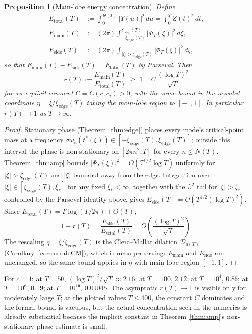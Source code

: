 \documentclass[11pt,a4paper]{article}
\theoremstyle{plain}
\newtheorem{proposition}[theorem]{Proposition}
\theoremstyle{definition}
\begin{document}
\begin{proposition}[Main-lobe energy concentration]\label{prop:conc}
Define
\begin{align*}
E_{\mathrm{total}}(T) &:= \int_0^{\Theta(T)}|Y(u)|^2\,du = \int_0^T Z(t)^2\,dt,\\
E_{\mathrm{main}}(T) &:= (2\pi)\int_{-\xi_{\mathrm{edge}}(T)}^{\xi_{\mathrm{edge}}(T)}|\Phi_T(\xi)|^2\,d\xi,\\
E_{\mathrm{side}}(T) &:= (2\pi)\int_{|\xi|>\xi_{\mathrm{edge}}(T)}|\Phi_T(\xi)|^2\,d\xi,
\end{align*}
so that $E_{\mathrm{main}}(T)+E_{\mathrm{side}}(T)=E_{\mathrm{total}}(T)$ by Parseval. Then
\[
r(T):=\frac{E_{\mathrm{main}}(T)}{E_{\mathrm{total}}(T)}\;\ge\;1-C\,\frac{(\log T)^2}{\sqrt{T}}
\]
for an explicit constant $C=C(c,c_\star)>0$, with the same bound in the rescaled coordinate $\eta=\xi/\xi_{\mathrm{edge}}(T)$ taking the main-lobe region to $[-1,1]$. In particular $r(T)\to 1$ as $T\to\infty$.
\end{proposition}
\begin{proof}
Stationary phase (Theorem~\ref{thm:edge}) places every mode's critical-point mass at a frequency $\sigma\omega_n(t^*(\xi))\in[-\xi_{\mathrm{edge}}(T),\xi_{\mathrm{edge}}(T)]$; outside this interval the phase is non-stationary on $[2\pi n^2,T]$ for every $n\le N(T)$. Theorem~\ref{thm:amp} bounds $|\Phi_T(\xi)|^2=O(T^{1/2}\log T)$ uniformly for $|\xi|>\xi_{\mathrm{edge}}(T)$ and $|\xi|$ bounded away from the edge. Integration over $|\xi|\in[\xi_{\mathrm{edge}}(T),\xi_*]$ for any fixed $\xi_*<\infty$, together with the $L^2$ tail for $|\xi|>\xi_*$ controlled by the Parseval identity above, gives $E_{\mathrm{side}}(T)=O(T^{1/2}(\log T)^2)$. Since $E_{\mathrm{total}}(T)=T\log(T/2\pi)+O(T)$,
\[
1-r(T)=\frac{E_{\mathrm{side}}(T)}{E_{\mathrm{total}}(T)}=O\!\left(\frac{(\log T)^2}{\sqrt{T}}\right).
\]
The rescaling $\eta=\xi/\xi_{\mathrm{edge}}(T)$ is the Clerc--Mallat dilation $\mathcal{D}_{a(T)}$ (Corollary~\ref{cor:rescaleCM}), which is mass-preserving: $E_{\mathrm{main}}$ and $E_{\mathrm{side}}$ are unchanged, so the same bound applies in $\eta$ with main-lobe region $[-1,1]$.
\end{proof}

\begin{remark}
For $c=1$: at $T=50$, $(\log T)^2/\sqrt{T}\approx 2.16$; at $T=100$, $2.12$; at $T=10^4$, $0.85$; at $T=10^6$, $0.19$; at $T=10^{10}$, $0.00045$. The asymptotic $r(T)\to 1$ is visible only for moderately large $T$; at the plotted values $T\le 400$, the constant $C$ dominates and the formal bound is vacuous, but the actual concentration seen in the numerics is already substantial because the implicit constant in Theorem~\ref{thm:amp}'s non-stationary-phase estimate is small.
\end{remark}
\end{document}
